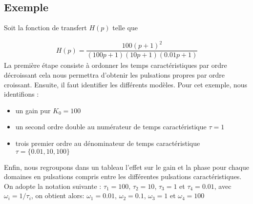 \subsection*{Exemple}

Soit la fonction de transfert $H(p)$ telle que 

\begin{align}
    H(p) = \dfrac{100(p+1)^2}{(100p+1)(10p+1)(0.01p+1)}\label{eq-ft_qq}
\end{align}
La première étape consiste à ordonner les temps caractéristiques par ordre décroissant 
cela nous permettra d'obtenir les pulsations propres par ordre croissant. 
Ensuite, il faut identifier les différents modèles.
Pour cet exemple, nous identifions :
\begin{itemize}
    \item un gain pur $K_0=100$
    \item un second ordre double au numérateur de temps caractéristique $\tau=1$
    \item trois premier ordre au dénominateur de temps caractéristique $\tau=\{0.01,10,100\}$
\end{itemize}

Enfin, nous regroupons dans un tableau l'effet 
sur le gain et la phase pour chaque domaines en pulsations compris entre les 
différentes pulsations caractéristiques.
On adopte la notation suivante : $\tau_1=100$, $\tau_2=10$, $\tau_3=1$ et $\tau_4=0.01$, avec $\omega_i=1/\tau_i$, 
on obtient alors:
$\omega_1=0.01$, $\omega_2=0.1$, $\omega_3=1$ et $\omega_4=100$

\begin{table}[!h]
\end{table}


